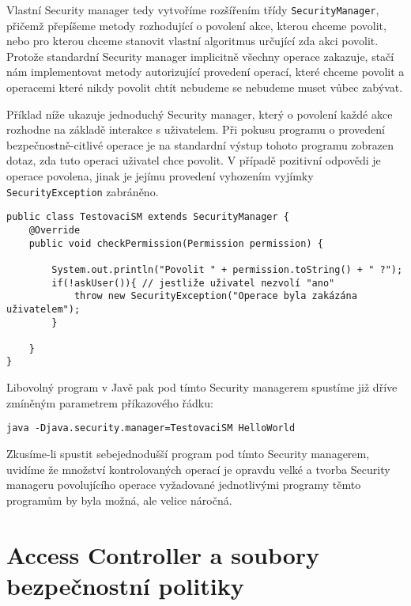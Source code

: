 Vlastní Security manager tedy vytvoříme rozšířením třídy {\tt SecurityManager}, přičemž přepíšeme metody rozhodující o povolení akce, kterou chceme povolit, nebo pro kterou chceme stanovit vlastní algoritmus určující zda akci povolit.
Protože standardní Security manager implicitně všechny operace zakazuje, stačí nám implementovat metody autorizující provedení operací, které chceme povolit a operacemi které nikdy povolit chtít nebudeme se nebudeme muset vůbec zabývat.

Příklad níže ukazuje jednoduchý Security manager, který o povolení každé akce rozhodne na základě interakce s uživatelem. Při pokusu programu o provedení bezpečnostně-citlivé operace je na standardní výstup tohoto programu zobrazen dotaz, zda tuto operaci uživatel chce povolit. V případě pozitivní odpovědi je operace povolena, jinak je jejímu provedení vyhozením vyjímky {\tt SecurityException} zabráněno.

\begin{verbatim}
public class TestovaciSM extends SecurityManager {
    @Override
    public void checkPermission(Permission permission) {
        
        System.out.println("Povolit " + permission.toString() + " ?");
        if(!askUser()){ // jestliže uživatel nezvolí "ano"
            throw new SecurityException("Operace byla zakázána uživatelem");
        }
        
    }
}
\end{verbatim}

Libovolný program v Javě pak pod tímto Security managerem spustíme již dříve zmíněným parametrem příkazového řádku:

\begin{verbatim}
java -Djava.security.manager=TestovaciSM HelloWorld
\end{verbatim}

Zkusíme-li spustit sebejednodušší program pod tímto Security managerem, uvidíme že množství kontrolovaných operací je opravdu velké a tvorba Security manageru povolujícího operace vyžadované jednotlivými programy těmto programům by byla možná, ale velice náročná.

\section{Access Controller a soubory bezpečnostní politiky}

